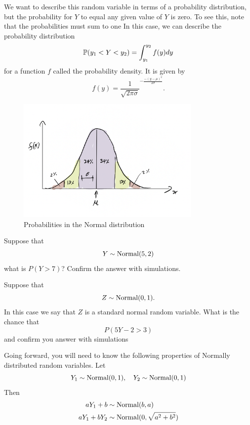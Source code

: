 We want to describe this random variable in terms of a probability distribution, but the probability for $Y$ to equal any given value of $Y$ is zero. To see this, note that the probabilities must sum to one  In this case, we can describe the probability distribution
\begin{equation}
\mathbb P(y_1<Y<y_2) = \int_{y_1}^{y_2}f(y)dy
\end{equation}
for a function $f$ called the probability density. It is given by
\begin{equation}
f(y) = \frac{1}{\sqrt{2\pi \sigma}}^{-\frac{-(y-\mu)^2}{2\sigma}}.
\end{equation}

\begin{figure}[h]
\centering
\includegraphics[width=0.8\textwidth]{bellcurve}
\caption{Probabilities in the Normal distribution}
\end{figure}


\begin{example}
Suppose that 
\begin{equation}
Y \sim {\rm Normal}(5,2)
\end{equation}
what is $P(Y>7)$?  Confirm the answer with simulations. 
\end{example}


\begin{exercise}
Suppose that 
\begin{equation}
Z \sim {\rm Normal}(0,1).
\end{equation}
In this case we say that $Z$ is a {\dfn standard normal} random variable. What is the chance that 
\begin{equation}
P(5Y-2>3)
\end{equation}
and confirm you answer with simulations 
\end{exercise}


Going forward, you will need to know the following properties of Normally distributed random variables. Let
\begin{equation}
Y_1 \sim {\rm Normal}(0,1),\quad Y_2 \sim {\rm Normal}(0,1)
\end{equation}
 Then
\begin{align}
aY_1 + b &\sim {\rm Normal}(b,a)\\
aY_1 + bY_2 &\sim {\rm Normal}(0,\sqrt{a^2 + b^2})
\end{align}

